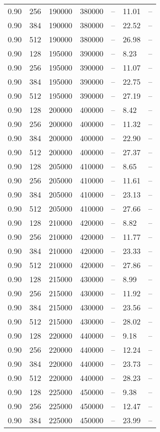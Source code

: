 \begin{tabular}{l|l|l|l|l|l|l}
0.90 & 256 & 190000 & 380000 & -- & 11.01 & --\\
0.90 & 384 & 190000 & 380000 & -- & 22.52 & --\\
0.90 & 512 & 190000 & 380000 & -- & 26.98 & --\\
0.90 & 128 & 195000 & 390000 & -- &  8.23 & --\\
0.90 & 256 & 195000 & 390000 & -- & 11.07 & --\\
0.90 & 384 & 195000 & 390000 & -- & 22.75 & --\\
0.90 & 512 & 195000 & 390000 & -- & 27.19 & --\\
0.90 & 128 & 200000 & 400000 & -- &  8.42 & --\\
0.90 & 256 & 200000 & 400000 & -- & 11.32 & --\\
0.90 & 384 & 200000 & 400000 & -- & 22.90 & --\\
0.90 & 512 & 200000 & 400000 & -- & 27.37 & --\\
0.90 & 128 & 205000 & 410000 & -- &  8.65 & --\\
0.90 & 256 & 205000 & 410000 & -- & 11.61 & --\\
0.90 & 384 & 205000 & 410000 & -- & 23.13 & --\\
0.90 & 512 & 205000 & 410000 & -- & 27.66 & --\\
0.90 & 128 & 210000 & 420000 & -- &  8.82 & --\\
0.90 & 256 & 210000 & 420000 & -- & 11.77 & --\\
0.90 & 384 & 210000 & 420000 & -- & 23.33 & --\\
0.90 & 512 & 210000 & 420000 & -- & 27.86 & --\\
0.90 & 128 & 215000 & 430000 & -- &  8.99 & --\\
0.90 & 256 & 215000 & 430000 & -- & 11.92 & --\\
0.90 & 384 & 215000 & 430000 & -- & 23.56 & --\\
0.90 & 512 & 215000 & 430000 & -- & 28.02 & --\\
0.90 & 128 & 220000 & 440000 & -- &  9.18 & --\\
0.90 & 256 & 220000 & 440000 & -- & 12.24 & --\\
0.90 & 384 & 220000 & 440000 & -- & 23.73 & --\\
0.90 & 512 & 220000 & 440000 & -- & 28.23 & --\\
0.90 & 128 & 225000 & 450000 & -- &  9.38 & --\\
0.90 & 256 & 225000 & 450000 & -- & 12.47 & --\\
0.90 & 384 & 225000 & 450000 & -- & 23.99 & --\\

\end{tabular}
